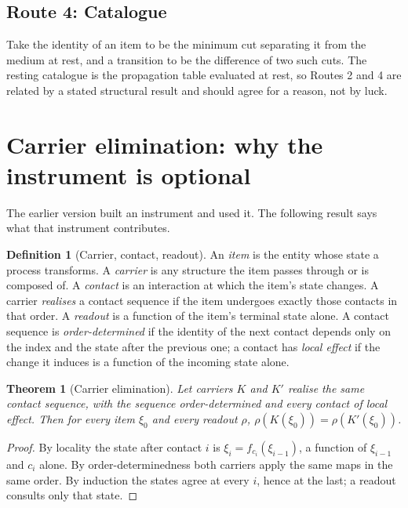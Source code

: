 \documentclass[11pt,a4paper]{article}
\theoremstyle{stmtstyle}
\newtheorem{theorem}{Theorem}
\theoremstyle{definition}
\newtheorem{definition}{Definition}
\theoremstyle{remark}
\begin{document}
\subsection*{Route 4: Catalogue}
Take the identity of an item to be the minimum cut separating it from the
medium at rest, and a transition to be the difference of two such cuts. The
resting catalogue is the propagation table evaluated at rest, so Routes 2
and 4 are related by a stated structural result and should agree for a
reason, not by luck.

\section{Carrier elimination: why the instrument is optional}
\label{sec:elimination}

The earlier version built an instrument and used it. The following result
says what that instrument contributes.

\begin{definition}[Carrier, contact, readout]
\label{def:carrier}
An \emph{item} is the entity whose state a process transforms. A
\emph{carrier} is any structure the item passes through or is composed of.
A \emph{contact} is an interaction at which the item's state changes. A
carrier \emph{realises} a contact sequence if the item undergoes exactly
those contacts in that order. A \emph{readout} is a function of the item's
terminal state alone. A contact sequence is \emph{order-determined} if the
identity of the next contact depends only on the index and the state after
the previous one; a contact has \emph{local effect} if the change it
induces is a function of the incoming state alone.
\end{definition}

\begin{theorem}[Carrier elimination]
\label{thm:elim}
Let carriers $K$ and $K'$ realise the same contact sequence, with the
sequence order-determined and every contact of local effect. Then for every
item $\xi_0$ and every readout $\rho$, $\rho(K(\xi_0))=\rho(K'(\xi_0))$.
\end{theorem}

\begin{proof}
By locality the state after contact $i$ is $\xi_i=f_{c_i}(\xi_{i-1})$, a
function of $\xi_{i-1}$ and $c_i$ alone. By order-determinedness both
carriers apply the same maps in the same order. By induction the states
agree at every $i$, hence at the last; a readout consults only that state.
\end{proof}
\end{document}
